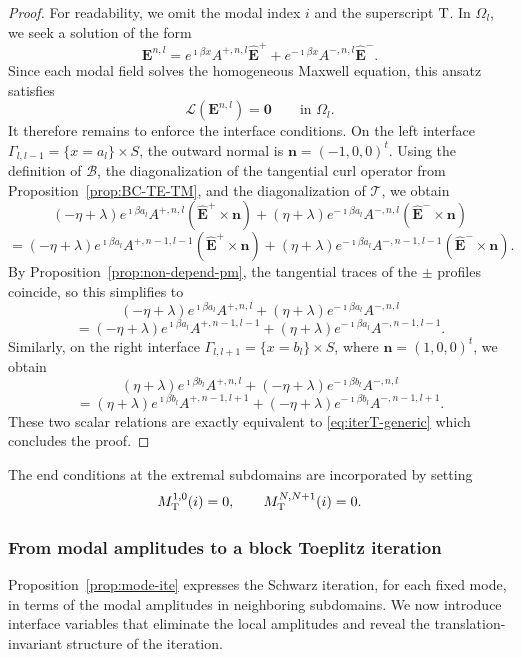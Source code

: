 \documentclass[smallextended]{svjour3}       %
\begin{document}
\begin{proof}
For readability, we omit the modal index $i$ and the superscript ${\rm T}$. In $\Omega_l$, we seek a solution of the form
\[
\mathbf E^{n,l}
=
e^{\imath \beta x}A^{+,n,l}\widehat{\mathbf E}^{+}
+
e^{-\imath \beta x}A^{-,n,l}\widehat{\mathbf E}^{-}.
\]
Since each modal field solves the homogeneous Maxwell equation, this ansatz satisfies
\[
\mathcal L(\mathbf E^{n,l})=\mathbf 0
\qquad\text{in }\Omega_l.
\]
It therefore remains to enforce the interface conditions. On the left interface $\Gamma_{l,l-1}=\{x=a_l\}\times S$, the outward normal is $\mathbf n=(-1,0,0)^t$. Using the definition of $\mathcal B$, the diagonalization of the tangential curl operator from Proposition~\ref{prop:BC-TE-TM}, and the diagonalization of $\mathcal T$, we obtain
\[
(-\eta+\lambda)e^{\imath\beta a_l}A^{+,n,l}(\widehat{\mathbf E}^{+}\times\mathbf n)
+
(\eta+\lambda)e^{-\imath\beta a_l}A^{-,n,l}(\widehat{\mathbf E}^{-}\times\mathbf n)
\]
\[
=
(-\eta+\lambda)e^{\imath\beta a_l}A^{+,n-1,l-1}(\widehat{\mathbf E}^{+}\times\mathbf n)
+
(\eta+\lambda)e^{-\imath\beta a_l}A^{-,n-1,l-1}(\widehat{\mathbf E}^{-}\times\mathbf n).
\]
By Proposition~\ref{prop:non-depend-pm}, the tangential traces of the $\pm$ profiles coincide, so this simplifies to
\[
(-\eta+\lambda)e^{\imath\beta a_l}A^{+,n,l}
+
(\eta+\lambda)e^{-\imath\beta a_l}A^{-,n,l}
\]
\[
=
(-\eta+\lambda)e^{\imath\beta a_l}A^{+,n-1,l-1}
+
(\eta+\lambda)e^{-\imath\beta a_l}A^{-,n-1,l-1}.
\]
Similarly, on the right interface $\Gamma_{l,l+1}=\{x=b_l\}\times S$, where $\mathbf n=(1,0,0)^t$, we obtain
\[
(\eta+\lambda)e^{\imath\beta b_l}A^{+,n,l}
+
(-\eta+\lambda)e^{-\imath\beta b_l}A^{-,n,l}
\]
\[
=
(\eta+\lambda)e^{\imath\beta b_l}A^{+,n-1,l+1}
+
(-\eta+\lambda)e^{-\imath\beta b_l}A^{-,n-1,l+1}.
\]
These two scalar relations are exactly equivalent to \eqref{eq:iterT-generic} which concludes the proof.
\end{proof}

\begin{remark}
The end conditions at the extremal subdomains are incorporated by setting
\[
M_{\rm T}^{1,0}(i)=0,
\qquad
M_{\rm T}^{N,N+1}(i)=0.
\]
\end{remark}

\subsubsection{From modal amplitudes to a block Toeplitz iteration}

Proposition~\ref{prop:mode-ite} expresses the Schwarz iteration, for each fixed mode, in terms of the modal amplitudes in neighboring subdomains. We now introduce interface variables that eliminate the local amplitudes and reveal the translation-invariant structure of the iteration.
\end{document}
